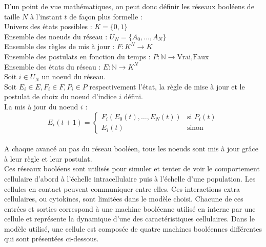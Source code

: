 \documentclass[11pt, a4paper]{article}
\begin{document}
D'un point de vue mathématiques, on peut donc définir les réseaux booléens de
taille $N$ à l'instant $t$ de façon plus formelle : \\
Univers des états possibles : $ K = \{0, 1\} $ \\
Ensemble des noeuds du réseau : $ U_N = \{A_0, \dots, A_N\}$ \\
Ensemble des règles de mis à jour : $ F : K^N \rightarrow K $ \\
Ensemble des postulats en fonction du temps :
$ P : \mathbb{N} \rightarrow {\mbox{Vrai}, \mbox{Faux}} $ \\
Ensemble des états du réseau : $ E : \mathbb{N} \rightarrow K^N $ \\
Soit $i\in U_N$ un noeud du réseau. \\
Soit $E_i \in E, F_i \in F, P_i \in P$ respectivement l'état, la règle de mise
à jour et le postulat de choix du noeud d'indice $i$ défini. \\
La mis à jour du noeud $i$ :
$$
E_i(t + 1) =
\left\{\begin{array}{rl}
    F_i(E_0(t), \dots, E_N(t)) & \mbox{si $P_i(t)$} \\
    E_i(t) & \mbox{sinon}
\end{array}\right.
$$ \\
A chaque avancé au pas du réseau booléen, tous les noeuds sont mis à jour grâce
à leur règle et leur postulat. \\

Ces réseaux booléens sont utilisés pour simuler et tenter de voir le
comportement cellulaire d'abord à l'échelle intracellulaire puis à l'échelle
d'une population. Les cellules en contact peuvent communiquer entre elles. Ces
interactions extra cellulaires, ou cytokines, sont limitées dans le modèle
choisi. Chacune de ces entrées et sorties correspond à une machine booléenne
utilisé en interne par une cellule et représente la dynamique d'une des
caractéristiques cellulaires. Dans le modèle utilisé, une cellule est composée
de quatre machines booléennes différentes qui sont présentées ci-dessous.
\end{document}
